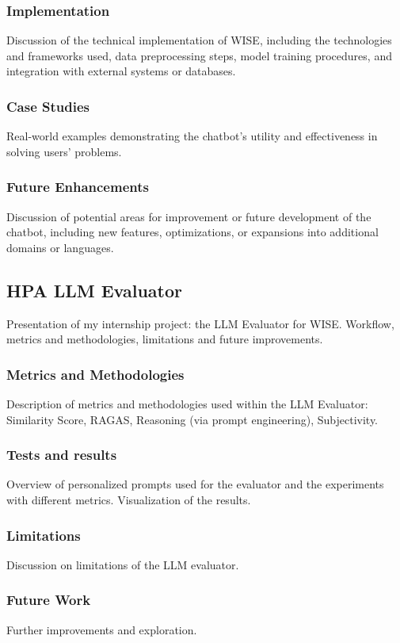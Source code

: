\documentclass[12pt]{article}
\begin{document}
\subsubsection{Implementation}
Discussion of the technical implementation of WISE, including the technologies and frameworks used, data preprocessing steps, model training procedures, and integration with external systems or databases.

\subsubsection{Case Studies}
Real-world examples demonstrating the chatbot’s utility and effectiveness in solving users’ problems.

\subsubsection{Future Enhancements}
Discussion of potential areas for improvement or future development of the chatbot, including new features, optimizations, or expansions into additional domains or languages.

\subsection{HPA LLM Evaluator}
Presentation of my internship project: the LLM Evaluator for WISE. Workflow, metrics and methodologies, limitations and future improvements.

\subsubsection{Metrics and Methodologies}
Description of metrics and methodologies used within the LLM Evaluator: Similarity Score, RAGAS, Reasoning (via prompt engineering), Subjectivity.

\subsubsection{Tests and results}
Overview of personalized prompts used for the evaluator and the experiments with different metrics. Visualization of the results.

\subsubsection{Limitations}
Discussion on limitations of the LLM evaluator.

\subsubsection{Future Work}
Further improvements and exploration.
\end{document}

